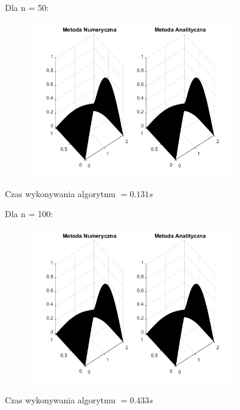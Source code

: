 \newpage

Dla n = 50:

\begin{figure}[!ht]
	\begin{center}
		\includegraphics[width=0.8\textwidth]{Lab7/charts/rmb/50.png}
	\end{center}
\end{figure}

Czas wykonywania algorytmu $ = 0.131s$

Dla n = 100:

\begin{figure}[!ht]
	\begin{center}
		\includegraphics[width=0.8\textwidth]{Lab7/charts/rmb/100.png}
	\end{center}
\end{figure}

Czas wykonywania algorytmu $ = 0.433s$
